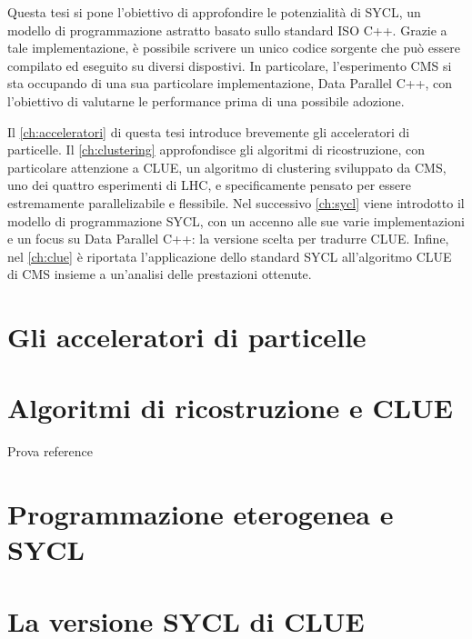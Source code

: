 \documentclass[12pt,a4paper]{report}
\begin{document}
Questa tesi si pone l'obiettivo di approfondire le potenzialità di SYCL, un modello di programmazione astratto basato sullo standard ISO C++. Grazie a tale implementazione, è possibile scrivere un unico codice sorgente che può essere compilato ed eseguito su diversi dispostivi. In particolare, l'esperimento CMS si sta occupando di una sua particolare implementazione, Data Parallel C++, con l'obiettivo di valutarne le performance prima di una possibile adozione. 

Il \autoref{ch:acceleratori} di questa tesi introduce brevemente gli acceleratori di particelle. Il \autoref{ch:clustering} approfondisce gli algoritmi di ricostruzione, con particolare attenzione a CLUE, un algoritmo di clustering sviluppato da CMS, uno dei quattro esperimenti di LHC, e specificamente pensato per essere estremamente parallelizabile e flessibile. Nel successivo \autoref{ch:sycl} viene introdotto il modello di programmazione SYCL, con un accenno alle sue varie implementazioni e un focus su Data Parallel C++: la versione scelta per tradurre CLUE. Infine, nel \autoref{ch:clue} è riportata l'applicazione dello standard SYCL all'algoritmo CLUE di CMS insieme a un'analisi delle prestazioni ottenute.

\chapter{Gli acceleratori di particelle}
\label{ch:acceleratori}


\chapter{Algoritmi di ricostruzione e CLUE}
\label{ch:clustering}
Prova reference\cite{CLUE}

\chapter{Programmazione eterogenea e SYCL}
\label{ch:sycl}

\chapter{La versione SYCL di CLUE}
\label{ch:clue}



\end{document}
